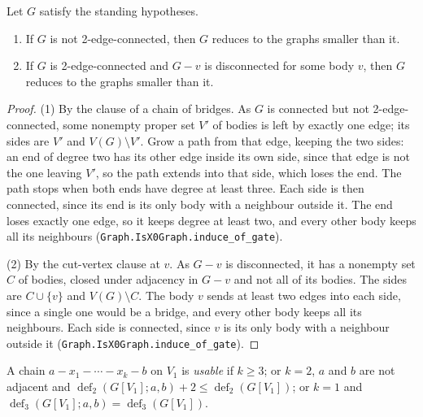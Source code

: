 \begin{lemma}
  \label{lem:pencil-x0-cut-reduces}
  \leanok
  Let $G$ satisfy the standing hypotheses.
  \begin{enumerate}
    \item If $G$ is not 2-edge-connected, then $G$ reduces to the graphs
      smaller than it.
    \item If $G$ is 2-edge-connected and $G - v$ is disconnected for some
      body $v$, then $G$ reduces to the graphs smaller than it.
  \end{enumerate}
\end{lemma}
\begin{proof}
  \leanok
  (1) By the clause of a chain of bridges. As $G$ is connected but not
  2-edge-connected, some nonempty proper set $V'$ of bodies is left by
  exactly one edge; its sides are $V'$ and $V(G) \setminus V'$. Grow a
  path from that edge, keeping the two sides: an end of degree two has
  its other edge inside its own side, since that edge is not the one
  leaving $V'$, so the path extends into that side, which loses the
  end. The path stops when both ends have degree at least three. Each
  side is then connected, since its end is its only body with a
  neighbour outside it. The end loses exactly one edge, so it keeps
  degree at least two, and every other body keeps all its neighbours
  (\texttt{Graph.IsX0Graph.induce\_of\_gate}).

  (2) By the cut-vertex clause at $v$. As $G - v$ is disconnected, it
  has a nonempty set $C$ of bodies, closed under adjacency in $G - v$
  and not all of its bodies. The sides are $C \cup \{v\}$ and
  $V(G) \setminus C$. The body $v$ sends at least two edges into each
  side, since a single one would be a bridge, and every other body
  keeps all its neighbours. Each side is connected, since $v$ is its
  only body with a neighbour outside it
  (\texttt{Graph.IsX0Graph.induce\_of\_gate}).
\end{proof}

\begin{definition}
  \label{def:pencil-x0-usable-chain}
  \leanok
  A chain $a - x_1 - \cdots - x_k - b$ on $V_1$ is \emph{usable} if
  $k \ge 3$; or $k = 2$, $a$ and $b$ are not adjacent and
  $\operatorname{def}_2(G[V_1]; a, b) + 2 \le
  \operatorname{def}_2(G[V_1])$; or $k = 1$ and
  $\operatorname{def}_3(G[V_1]; a, b) = \operatorname{def}_3(G[V_1])$.
\end{definition}

